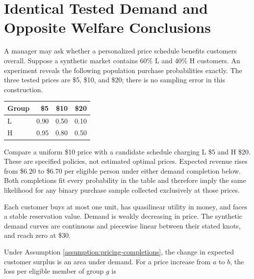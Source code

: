 
\hypertarget{M09-identical-tested-demand-and-opposite-welfare-conclusions}{%
\section{Identical Tested Demand and Opposite Welfare
Conclusions}\label{M09-identical-tested-demand-and-opposite-welfare-conclusions}}

\noindent \noindent A manager may ask whether a personalized price schedule
benefits customers overall. Suppose a synthetic market contains 60\% L
and 40\% H customers. An experiment reveals the following population
purchase probabilities exactly. The three tested prices are \$5, \$10,
and \$20; there is no sampling error in this construction.

\begin{table}[H]
\centering\small
\begin{tabular}{@{}lrrr@{}}
\toprule
Group & \$5 & \$10 & \$20 \\
\midrule

L & 0.90 & 0.50 & 0.10 \\
H & 0.95 & 0.80 & 0.50 \\
\bottomrule
\end{tabular}
\end{table}

Compare a uniform \$10 price with a candidate schedule charging L \$5
and H \$20. These are specified policies, not estimated optimal prices.
Expected revenue rises from \$6.20 to \$6.70 per eligible person under
either demand completion below. Both completions fit every probability
in the table and therefore imply the same likelihood for any binary
purchase sample collected exclusively at those prices.

\begin{assumption}
\label{assumption:pricing-completions}
Each customer buys at most one unit, has quasilinear utility in money, and faces a stable reservation value. Demand is weakly decreasing in price. The synthetic demand curves are continuous and piecewise linear between their stated knots, and reach zero at \$30.
\end{assumption}

Under Assumption \ref{assumption:pricing-completions}, the change in
expected customer surplus is an area under demand. For a price increase
from \(a\) to \(b\), the loss per eligible member of group \(g\) is

